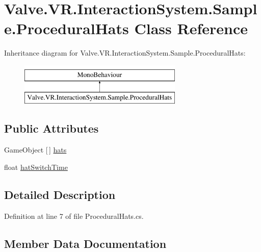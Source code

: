 \hypertarget{class_valve_1_1_v_r_1_1_interaction_system_1_1_sample_1_1_procedural_hats}{}\section{Valve.\+V\+R.\+Interaction\+System.\+Sample.\+Procedural\+Hats Class Reference}
\label{class_valve_1_1_v_r_1_1_interaction_system_1_1_sample_1_1_procedural_hats}
Inheritance diagram for Valve.\+V\+R.\+Interaction\+System.\+Sample.\+Procedural\+Hats\+:\begin{figure}[H]
\begin{center}
\leavevmode
\includegraphics[height=2.000000cm]{class_valve_1_1_v_r_1_1_interaction_system_1_1_sample_1_1_procedural_hats}
\end{center}
\end{figure}
\subsection*{Public Attributes}
\begin{DoxyCompactItemize}
\item 
Game\+Object \mbox{[}$\,$\mbox{]} \mbox{\hyperlink{class_valve_1_1_v_r_1_1_interaction_system_1_1_sample_1_1_procedural_hats_addd95ed6c1c6d8203fad5d38fae4a6e2}{hats}}
\item 
float \mbox{\hyperlink{class_valve_1_1_v_r_1_1_interaction_system_1_1_sample_1_1_procedural_hats_abdce8dde269ca2193a7e9a95cfaddd02}{hat\+Switch\+Time}}
\end{DoxyCompactItemize}


\subsection{Detailed Description}


Definition at line 7 of file Procedural\+Hats.\+cs.



\subsection{Member Data Documentation}
\mbox{\label{class_valve_1_1_v_r_1_1_interaction_system_1_1_sample_1_1_procedural_hats_addd95ed6c1c6d8203fad5d38fae4a6e2}} 
